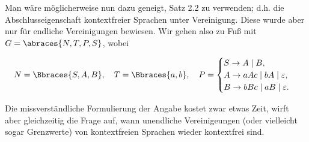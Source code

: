\begin{solution}
\begin{enumerate}
    Man wäre möglicherweise nun dazu geneigt, Satz 2.2 zu verwenden; d.h. die Abschlusseigenschaft kontextfreier Sprachen unter Vereinigung.
    Diese wurde aber nur für endliche Vereinigungen bewiesen.
    Wir gehen also zu Fuß mit $G = \abraces{N, T, P, S}$, wobei

    \begin{align*}
        N = \Bbraces{S, A, B},
        \quad
        T = \Bbraces{a, b},
        \quad
        P
        =
        \begin{cases}
            S \to A \mid B, \\
            A \to a A c \mid b A \mid \varepsilon, \\
            B \to b B c \mid a B \mid \varepsilon.
        \end{cases}
    \end{align*}

\end{enumerate}

Die missverständliche Formulierung der Angabe kostet zwar etwas Zeit, wirft aber gleichzeitig die Frage auf, wann unendliche Vereinigeungen (oder vielleicht sogar Grenzwerte) von kontextfreien Sprachen wieder kontextfrei sind.

\end{solution}

